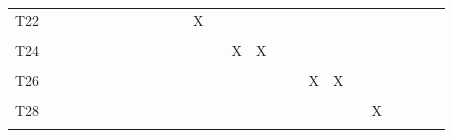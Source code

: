 \documentclass[
]{article}
\begin{document}
\begin{longtable}[l]{lllllllllllllllllllllllll}
T22 &  &  &  &  &  &  &  &  &  &  & X &  &  &  &  &  &  &  &  &  &  &  &  & \\
\cellcolor{gray!6}{T23} & \cellcolor{gray!6}{} & \cellcolor{gray!6}{} & \cellcolor{gray!6}{} & \cellcolor{gray!6}{} & \cellcolor{gray!6}{} & \cellcolor{gray!6}{} & \cellcolor{gray!6}{} & \cellcolor{gray!6}{} & \cellcolor{gray!6}{} & \cellcolor{gray!6}{} & \cellcolor{gray!6}{} & \cellcolor{gray!6}{X} & \cellcolor{gray!6}{} & \cellcolor{gray!6}{} & \cellcolor{gray!6}{} & \cellcolor{gray!6}{} & \cellcolor{gray!6}{} & \cellcolor{gray!6}{} & \cellcolor{gray!6}{} & \cellcolor{gray!6}{} & \cellcolor{gray!6}{} & \cellcolor{gray!6}{} & \cellcolor{gray!6}{} & \cellcolor{gray!6}{}\\
T24 &  &  &  &  &  &  &  &  &  &  &  &  & X & X &  &  &  &  &  &  &  &  &  & \\
\cellcolor{gray!6}{T25} & \cellcolor{gray!6}{} & \cellcolor{gray!6}{} & \cellcolor{gray!6}{} & \cellcolor{gray!6}{} & \cellcolor{gray!6}{} & \cellcolor{gray!6}{} & \cellcolor{gray!6}{} & \cellcolor{gray!6}{} & \cellcolor{gray!6}{} & \cellcolor{gray!6}{} & \cellcolor{gray!6}{} & \cellcolor{gray!6}{} & \cellcolor{gray!6}{} & \cellcolor{gray!6}{} & \cellcolor{gray!6}{X} & \cellcolor{gray!6}{X} & \cellcolor{gray!6}{} & \cellcolor{gray!6}{} & \cellcolor{gray!6}{} & \cellcolor{gray!6}{} & \cellcolor{gray!6}{} & \cellcolor{gray!6}{} & \cellcolor{gray!6}{} & \cellcolor{gray!6}{}\\
\addlinespace
T26 &  &  &  &  &  &  &  &  &  &  &  &  &  &  &  &  & X & X &  &  &  &  &  & \\
\cellcolor{gray!6}{T27} & \cellcolor{gray!6}{} & \cellcolor{gray!6}{} & \cellcolor{gray!6}{} & \cellcolor{gray!6}{} & \cellcolor{gray!6}{} & \cellcolor{gray!6}{} & \cellcolor{gray!6}{} & \cellcolor{gray!6}{} & \cellcolor{gray!6}{} & \cellcolor{gray!6}{} & \cellcolor{gray!6}{} & \cellcolor{gray!6}{} & \cellcolor{gray!6}{} & \cellcolor{gray!6}{} & \cellcolor{gray!6}{} & \cellcolor{gray!6}{} & \cellcolor{gray!6}{} & \cellcolor{gray!6}{} & \cellcolor{gray!6}{X} & \cellcolor{gray!6}{} & \cellcolor{gray!6}{} & \cellcolor{gray!6}{} & \cellcolor{gray!6}{} & \cellcolor{gray!6}{}\\
T28 &  &  &  &  &  &  &  &  &  &  &  &  &  &  &  &  &  &  &  & X &  &  &  & \\
\cellcolor{gray!6}{T29} & \cellcolor{gray!6}{} & \cellcolor{gray!6}{} & \cellcolor{gray!6}{} & \cellcolor{gray!6}{} & \cellcolor{gray!6}{} & \cellcolor{gray!6}{} & \cellcolor{gray!6}{} & \cellcolor{gray!6}{} & \cellcolor{gray!6}{} & \cellcolor{gray!6}{} & \cellcolor{gray!6}{} & \cellcolor{gray!6}{} & \cellcolor{gray!6}{} & \cellcolor{gray!6}{} & \cellcolor{gray!6}{} & \cellcolor{gray!6}{} & \cellcolor{gray!6}{} & \cellcolor{gray!6}{} & \cellcolor{gray!6}{} & \cellcolor{gray!6}{} & \cellcolor{gray!6}{X} & \cellcolor{gray!6}{} & \cellcolor{gray!6}{} & \cellcolor{gray!6}{}\\

\end{longtable}
\end{document}
